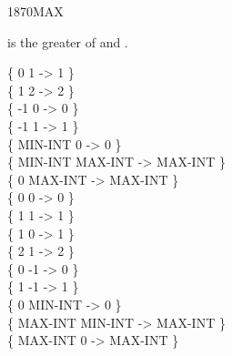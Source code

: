 \begin{worddef}{1870}{MAX}
\item {}

	 is the greater of  and .

	\begin{defer}
	\testing
		\{       0       1  ->       1 \} \\
		\{       1       2  ->       2 \} \\
		\{      -1       0  ->       0 \} \\
		\{      -1       1  ->       1 \} \\
		\{ MIN-INT       0  ->       0 \} \\
		\{ MIN-INT MAX-INT  -> MAX-INT \} \\
		\{       0 MAX-INT  -> MAX-INT \} \\
		\{       0       0  ->       0 \} \\
		\{       1       1  ->       1 \} \\
		\{       1       0  ->       1 \} \\
		\{       2       1  ->       2 \} \\
		\{       0      -1  ->       0 \} \\
		\{       1      -1  ->       1 \} \\
		\{       0 MIN-INT  ->       0 \} \\
		\{ MAX-INT MIN-INT  -> MAX-INT \} \\
		\{ MAX-INT       0  -> MAX-INT \} \\
	\end{defer}
\end{worddef}


